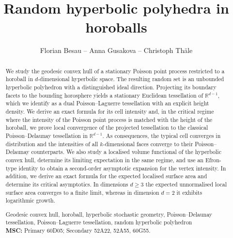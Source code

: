 \documentclass[11pt,a4paper]{article}
\theoremstyle{plain}
\theoremstyle{definition}
\theoremstyle{remark}
\begin{document}
\title{\bfseries Random hyperbolic polyhedra in horoballs}%

\author{Florian Besau\footnotemark[1]\;\; --\; Anna Gusakova\footnotemark[2]\;\; --\; Christoph Th\"ale\footnotemark[3]}

\date{}
\renewcommand{\thefootnote}{\fnsymbol{footnote}}

\maketitle

\begin{abstract}
	\noindent
	We study the geodesic convex hull of a stationary Poisson point process restricted to a horoball in $d$-dimensional hyperbolic space. The resulting random set is an unbounded hyperbolic polyhedron with a distinguished ideal direction. Projecting its boundary facets to the bounding horosphere yields a stationary Euclidean tessellation of $\mathbb{R}^{d-1}$, which we identify as a dual Poisson--Laguerre tessellation with an explicit height density. We derive an exact formula for its cell intensity and, in the critical regime where the intensity of the Poisson point process is matched with the height of the horoball, we prove local convergence of the projected tessellation to the classical Poisson--Delaunay tessellation in $\mathbb{R}^{d-1}$. As consequences, the typical cell converges in distribution and the intensities of all $k$-dimensional faces converge to their Poisson--Delaunay counterparts. We also study a localised volume functional of the hyperbolic convex hull, determine its limiting expectation in the same regime, and use an Efron-type identity to obtain a second-order asymptotic expansion for the vertex intensity. In addition, we derive an exact formula for the expected localised surface area and determine its critical asymptotics. In dimensions $d\ge3$ the expected unnormalised local surface area converges to a finite limit, whereas in dimension $d=2$ it exhibits logarithmic growth.

	\medskip
	 Geodesic convex hull, horoball, hyperbolic stochastic geometry, Poisson--Delaunay tessellation, Poisson--Laguerre tessellation, random hyperbolic polyhedron\\
	\textbf{MSC:} Primary 60D05; Secondary 52A22, 52A55, 60G55.
\end{abstract}
\end{document}
